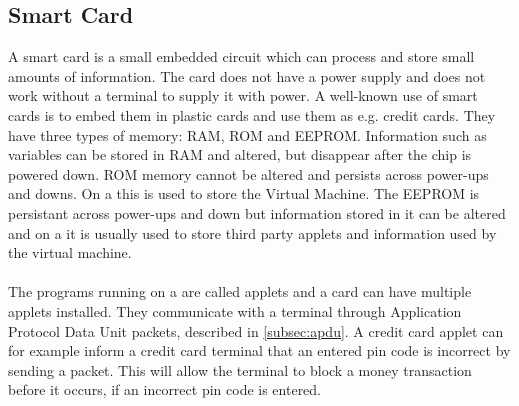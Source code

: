 \subsection{Smart Card}\label{subsec:smartcard}
A smart card is a small embedded circuit which can process and store small amounts of information. The card does not have a power supply and does not work without a terminal to supply it with power. A well-known use of smart cards is to embed them in plastic cards and use them as e.g. credit cards. They have three types of memory: RAM, ROM and EEPROM. Information such as variables can be stored in RAM and altered, but disappear after the chip is powered down. ROM memory cannot be altered and persists across power-ups and downs. On a \jc this is used to store the \jc Virtual Machine. The EEPROM is persistant across power-ups and down but information stored in it can be altered and on a \jc it is usually used to store third party applets and information used by the virtual machine.\\\\
The programs running on a \jc are called applets and a card can have multiple applets installed. They communicate with a terminal through Application Protocol Data Unit packets, described in \cref{subsec:apdu}. A credit card applet can for example inform a credit card terminal that an entered pin code is incorrect by sending a packet. This will allow the terminal to block a money transaction before it occurs, if an incorrect pin code is entered.